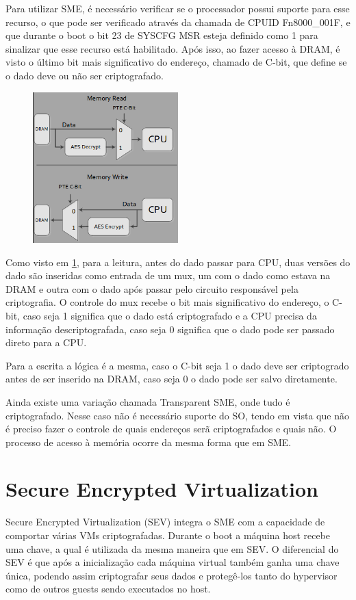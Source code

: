 \documentclass{report}
\begin{document}
Para utilizar SME, é necessário verificar se o processador possui suporte para
esse recurso, o que pode ser verificado através da chamada de CPUID
Fn8000\_001F, e que durante o boot o bit 23 de SYSCFG MSR esteja definido como 1
para sinalizar que esse recurso está habilitado. Após isso, ao fazer acesso à
DRAM, é visto o último bit mais significativo do endereço, chamado de C-bit,
que define se o dado deve ou não ser criptografado.

\begin{figure}[h]
    \centering
    \includegraphics[width=0.5\textwidth]{img/sme_read_write_architecture}
    \label{sme-read-write}
\end{figure}

Como visto em \ref{sme-read-write}, para a leitura, antes do dado passar para
CPU, duas versões do dado são inseridas como entrada de um mux, um com o dado
como estava na DRAM e outra com o dado após passar pelo circuito responsável
pela criptografia. O controle do mux recebe o bit mais significativo do
endereço, o C-bit, caso seja 1 significa que o dado está criptografado e a CPU
precisa da informação descriptografada, caso seja 0 significa que o dado pode
ser passado direto para a CPU.

Para a escrita a lógica é a mesma, caso o C-bit seja 1 o dado deve ser
criptogrado antes de ser inserido na DRAM, caso seja 0 o dado pode ser salvo
diretamente.

Ainda existe uma variação chamada Transparent SME, onde tudo é criptografado.
Nesse caso não é necessário suporte do SO, tendo em vista que não é preciso
fazer o controle de quais endereços serã criptografados e quais não. O processo
de acesso à memória ocorre da mesma forma que em SME.


\section{Secure Encrypted Virtualization}
Secure Encrypted Virtualization (SEV) integra o SME com a capacidade de
comportar várias VMs criptografadas. Durante o boot a máquina host recebe uma
chave, a qual é utilizada da mesma maneira que em SEV. O diferencial do SEV é
que após a inicialização cada máquina virtual também ganha uma chave única,
podendo assim criptografar seus dados e protegê-los tanto do hypervisor como de
outros guests sendo executados no host.
\end{document}

